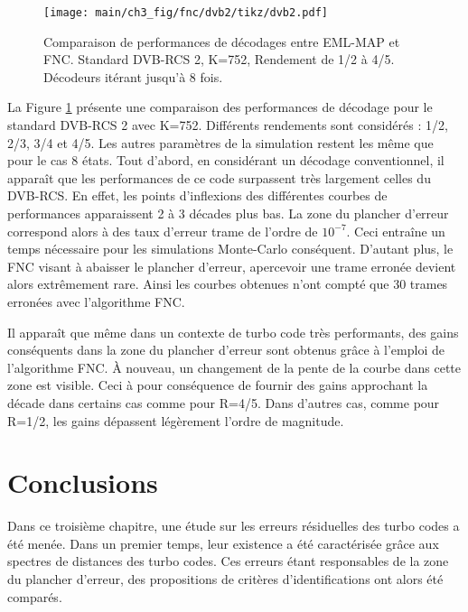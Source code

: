\begin{figure}[!htb]
	\centering
	\texttt{[image: main/ch3\_fig/fnc/dvb2/tikz/dvb2.pdf]}
	\caption{Comparaison de performances de décodages entre EML-MAP et FNC. Standard DVB-RCS 2, K=752, Rendement de 1/2 à 
	4/5. Décodeurs itérant jusqu'à 8 fois. \label{fig:fnc_dvb2_752}}
\end{figure}

La Figure \ref{fig:fnc_dvb2_752} présente une comparaison des performances de décodage pour le standard DVB-RCS 2 avec
K=752. Différents rendements sont considérés : 1/2, 2/3, 3/4 et 4/5. Les autres paramètres de la simulation restent les
même que pour le cas 8 états.
Tout d'abord, en considérant un décodage conventionnel, il apparaît que les performances de ce code surpassent très largement 
celles du DVB-RCS. En effet, les points d'inflexions des différentes courbes de performances apparaissent 2 à 3 décades
plus bas. La zone du plancher d'erreur correspond alors à des taux d'erreur trame de l'ordre de $10^{-7}$. Ceci entraîne
un temps nécessaire pour les simulations Monte-Carlo conséquent. D'autant plus, le FNC visant à abaisser le plancher 
d'erreur, apercevoir une trame erronée devient alors extrêmement rare. Ainsi les courbes obtenues n'ont compté que 30 
trames erronées avec l'algorithme FNC.

Il apparaît que même dans un contexte de turbo code très performants, des gains conséquents dans la zone du plancher d'erreur 
sont obtenus grâce à l'emploi de l'algorithme FNC. À nouveau, un changement de la pente de la courbe dans cette zone est
visible. Ceci à pour conséquence de fournir des gains approchant la décade dans certains cas comme pour R=4/5. Dans d'autres
cas, comme pour R=1/2, les gains dépassent légèrement l'ordre de magnitude.

\section{Conclusions}
Dans ce troisième chapitre, une étude sur les erreurs résiduelles des turbo codes a été menée. Dans un premier temps,
leur existence a été caractérisée grâce aux spectres de distances des turbo codes. Ces erreurs étant responsables de 
la zone du plancher d'erreur, des propositions de critères d'identifications ont alors été comparés.

